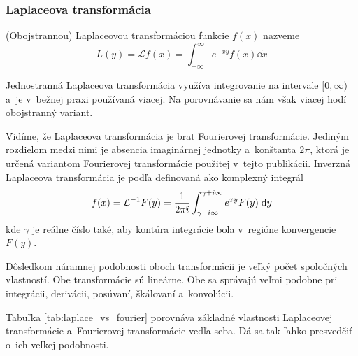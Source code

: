 \subsubsection{Laplaceova transformácia}
\begin{definicia}
(Obojstrannou) Laplaceovou transformáciou funkcie $f(x)$ nazveme
\begin{equation*}
L(y) = \mathcal{L} f(x) = \int_{-\infty}^{\infty} e^{-xy} f(x) \dd x
\end{equation*}
\end{definicia}
\begin{poznamka}
    Jednostranná Laplaceova transformácia využíva integrovanie na
    intervale $[0,\infty)$ a~je v~bežnej praxi používaná viacej. Na
    porovnávanie sa nám však viacej hodí obojstranný variant.
\end{poznamka}
Vidíme, že Laplaceova transformácia je brat Fourierovej transformácie.
Jediným rozdielom medzi nimi je absencia imaginárnej jednotky 
a~konštanta $2\pi$, ktorá je určená variantom Fourierovej transformácie
použitej v~tejto publikácii.
Inverzná Laplaceova transformácia je podľa
\cite{wiki:laplace_transform} 
definovaná ako komplexný integrál
\begin{equation*}
    f(x) = \mathcal{L}^{-1} F(y) = \frac{1}{2 \pi \hat{\imath}}
        \int_{\gamma - \hat{\imath} \infty}^{\gamma + \hat{\imath} \infty}
        e^{x y} F(y) \; \mathrm{d} y
\end{equation*}
kde $\gamma$ je reálne číslo také, aby kontúra  integrácie bola 
v~regióne konvergencie $F(y)$.

Dôsledkom náramnej podobnosti oboch transformácii je veľký počet
spoločných vlastností. Obe transformácie sú lineárne. Obe sa správajú
veľmi podobne pri integrácii, derivácii, posúvaní, škálovaní 
a~konvolúcii.

Tabuľka \ref{tab:laplace_vs_fourier} porovnáva základné vlastnosti
Laplaceovej transformácie a~Fourierovej transformácie vedľa seba. Dá
sa tak ľahko presvedčiť o~ich veľkej podobnosti.

